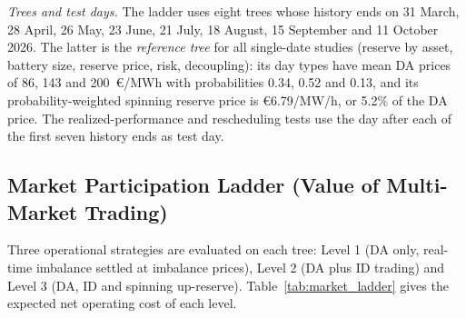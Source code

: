 \documentclass[5p,times,twocolumn]{elsarticle}
\begin{document}
\textit{Trees and test days.} The ladder uses eight trees whose history ends on 31 March, 28 April, 26 May, 23 June, 21 July, 18 August, 15 September and 11 October 2026. The latter is the \emph{reference tree} for all single-date studies (reserve by asset, battery size, reserve price, risk, decoupling): its day types have mean DA prices of 86, 143 and 200~\euro/MWh with probabilities 0.34, 0.52 and 0.13, and its probability-weighted spinning reserve price is \euro 6.79/MW/h, or 5.2\% of the DA price. The realized-performance and rescheduling tests use the day after each of the first seven history ends as test day.

\subsection{Market Participation Ladder (Value of Multi-Market Trading)}\label{sec:ladder}
Three operational strategies are evaluated on each tree: Level 1 (DA only, real-time imbalance settled at imbalance prices), Level 2 (DA plus ID trading) and Level 3 (DA, ID and spinning up-reserve). Table~\ref{tab:market_ladder} gives the expected net operating cost of each level.

\begin{table}[t]
\caption{Market participation cost ladder on real DK1 prices (expected net operating cost on the tree, \euro; saving in \euro{} and \% against Level 1). Reserve is a Stage-1 quantity at real spinning prices. Gurobi, gap $\le0.5\%$; $^\dagger$HiGHS, reference tree.}
\label{tab:market_ladder}
\centering
\scriptsize
\setlength{\tabcolsep}{2.2pt}
\renewcommand{\arraystretch}{1.1}
\end{table}
\end{document}
